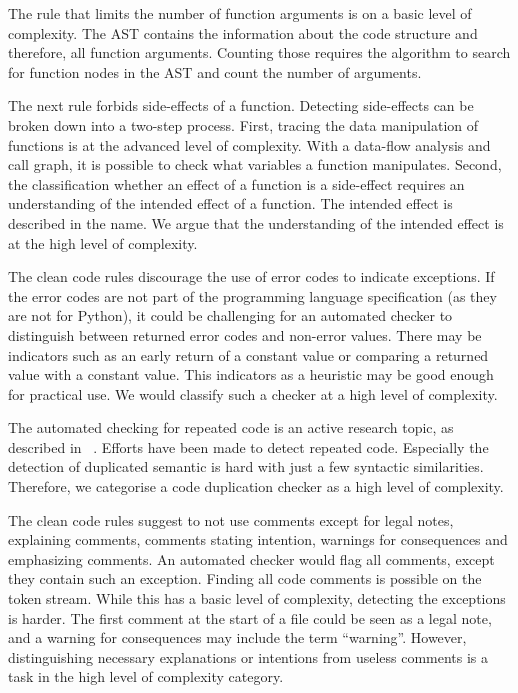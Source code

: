 The rule that limits the number of function arguments is on a basic level of complexity. The AST contains the information about the code structure and therefore, all function arguments. Counting those requires the algorithm to search for function nodes in the AST and count the number of arguments.

The next rule forbids side-effects of a function. Detecting side-effects can be broken down into a two-step process.
First, tracing the data manipulation of functions is at the advanced level of complexity. With a data-flow analysis and call graph, it is possible to check what variables a function manipulates. Second, the classification whether an effect of a function is a side-effect requires an understanding of the intended effect of a function. The intended effect is described in the name. We argue that the understanding of the intended effect is at the high level of complexity. 

The clean code rules discourage the use of error codes to indicate exceptions. If the error codes are not part of the programming language specification (as they are not for Python), it could be challenging for an automated checker to distinguish between returned error codes and non-error values. There may be indicators such as an early return of a constant value or comparing a returned value with a constant value. This indicators as a heuristic may be good enough for practical use. We would classify such a checker at a high level of complexity. 

The automated checking for repeated code is an active research topic, as described in ~\cite{buch_learning-based_2019,saini_oreo_2018}. Efforts have been made to detect repeated code. Especially the detection of duplicated semantic is hard with just a few syntactic similarities. Therefore, we categorise a code duplication checker as a high level of complexity.

The clean code rules suggest to not use comments except for legal notes, explaining comments, comments stating intention, warnings for consequences and emphasizing comments. An automated checker would flag all comments, except they contain such an exception. Finding all code comments is possible on the token stream. While this has a basic level of complexity, detecting the exceptions is harder. The first comment at the start of a file could be seen as a legal note, and a warning for consequences may include the term \enquote{warning}. However, distinguishing necessary explanations or intentions from useless comments is a task in the high level of complexity category.


